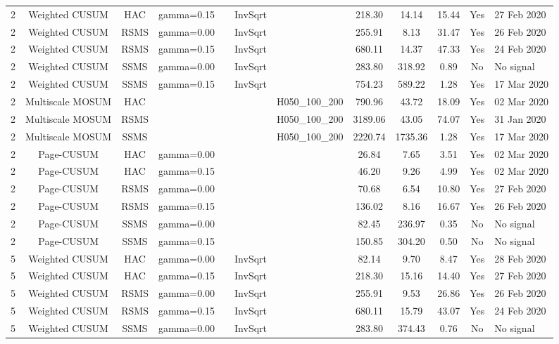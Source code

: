\begin{table}[htbp]
\begin{tabular}{cccccccccccl}
2 & Weighted CUSUM & HAC & gamma=0.15 &  & InvSqrt &  & 218.30 & 14.14 & 15.44 & Yes & 27 Feb 2020 \\
2 & Weighted CUSUM & RSMS & gamma=0.00 &  & InvSqrt &  & 255.91 & 8.13 & 31.47 & Yes & 26 Feb 2020 \\
2 & Weighted CUSUM & RSMS & gamma=0.15 &  & InvSqrt &  & 680.11 & 14.37 & 47.33 & Yes & 24 Feb 2020 \\
2 & Weighted CUSUM & SSMS & gamma=0.00 &  & InvSqrt &  & 283.80 & 318.92 & 0.89 & No & No signal \\
2 & Weighted CUSUM & SSMS & gamma=0.15 &  & InvSqrt &  & 754.23 & 589.22 & 1.28 & Yes & 17 Mar 2020 \\
2 & Multiscale MOSUM & HAC &  &  &  & H050_100_200 & 790.96 & 43.72 & 18.09 & Yes & 02 Mar 2020 \\
2 & Multiscale MOSUM & RSMS &  &  &  & H050_100_200 & 3189.06 & 43.05 & 74.07 & Yes & 31 Jan 2020 \\
2 & Multiscale MOSUM & SSMS &  &  &  & H050_100_200 & 2220.74 & 1735.36 & 1.28 & Yes & 17 Mar 2020 \\
2 & Page-CUSUM & HAC & gamma=0.00 &  &  &  & 26.84 & 7.65 & 3.51 & Yes & 02 Mar 2020 \\
2 & Page-CUSUM & HAC & gamma=0.15 &  &  &  & 46.20 & 9.26 & 4.99 & Yes & 02 Mar 2020 \\
2 & Page-CUSUM & RSMS & gamma=0.00 &  &  &  & 70.68 & 6.54 & 10.80 & Yes & 27 Feb 2020 \\
2 & Page-CUSUM & RSMS & gamma=0.15 &  &  &  & 136.02 & 8.16 & 16.67 & Yes & 26 Feb 2020 \\
2 & Page-CUSUM & SSMS & gamma=0.00 &  &  &  & 82.45 & 236.97 & 0.35 & No & No signal \\
2 & Page-CUSUM & SSMS & gamma=0.15 &  &  &  & 150.85 & 304.20 & 0.50 & No & No signal \\
5 & Weighted CUSUM & HAC & gamma=0.00 &  & InvSqrt &  & 82.14 & 9.70 & 8.47 & Yes & 28 Feb 2020 \\
5 & Weighted CUSUM & HAC & gamma=0.15 &  & InvSqrt &  & 218.30 & 15.16 & 14.40 & Yes & 27 Feb 2020 \\
5 & Weighted CUSUM & RSMS & gamma=0.00 &  & InvSqrt &  & 255.91 & 9.53 & 26.86 & Yes & 26 Feb 2020 \\
5 & Weighted CUSUM & RSMS & gamma=0.15 &  & InvSqrt &  & 680.11 & 15.79 & 43.07 & Yes & 24 Feb 2020 \\
5 & Weighted CUSUM & SSMS & gamma=0.00 &  & InvSqrt &  & 283.80 & 374.43 & 0.76 & No & No signal \\

\end{tabular}
\end{table}
